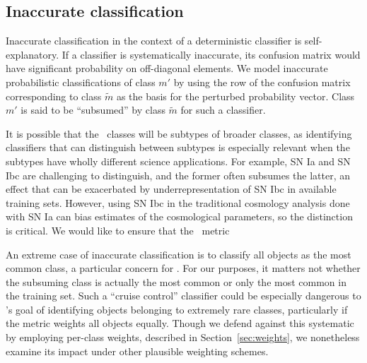 \subsection{Inaccurate classification}
\label{sec:inaccuratedata}

Inaccurate classification in the context of a deterministic classifier is self-explanatory.
If a classifier is systematically inaccurate, its confusion matrix would have significant probability on off-diagonal elements.
We model inaccurate probabilistic classifications of class $m'$ by using the row of the confusion matrix corresponding to class $\tilde{m}$ as the basis for the perturbed probability vector.
Class $m'$ is said to be ``subsumed'' by class $\tilde{m}$ for such a classifier.

It is possible that the \plasticc\ classes will be subtypes of broader classes, as identifying classifiers that can distinguish between subtypes is especially relevant when the subtypes have wholly different science applications.
For example, SN Ia and SN Ibc are challenging to distinguish, and the former often subsumes the latter, an effect that can be exacerbated by underrepresentation of SN Ibc in available training sets.
However, using SN Ibc in the traditional cosmology analysis done with SN Ia can bias estimates of the cosmological parameters, so the distinction is critical.
We would like to ensure that the \plasticc\ metric

An extreme case of inaccurate classification is to classify all objects as the most common class, a particular concern for \plasticc.
For our purposes, it matters not whether the subsuming class is actually the most common or only the most common in the training set.
Such a ``cruise control'' classifier could be especially dangerous to \plasticc's goal of identifying objects belonging to extremely rare classes, particularly if the metric weights all objects equally.
Though we defend against this systematic by employing per-class weights, described in Section~\ref{sec:weights}, we nonetheless examine its impact under other plausible weighting schemes.

%

